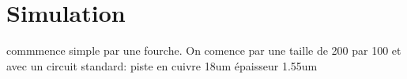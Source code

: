 \section{Simulation}
commmence simple par une fourche. On comence par une taille de 200 par 100 et avec un circuit standard: piste en cuivre 18um  épaisseur 1.55um 
